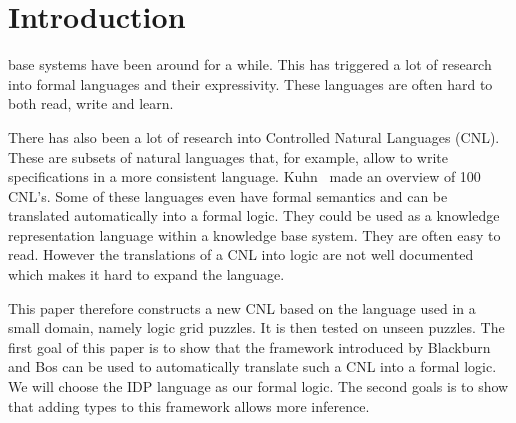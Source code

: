 \section{Introduction}

 base systems have been around for a while. This has triggered a lot of research into formal languages and their expressivity. These languages are often hard to both read, write and learn.

There has also been a lot of research into Controlled Natural Languages (CNL). These are subsets of natural languages that, for example, allow to write specifications in a more consistent language. Kuhn~\cite{Kuhn2014} made an overview of 100 CNL's. Some of these languages even have formal semantics and can be translated automatically into a formal logic. They could be used as a knowledge representation language within a knowledge base system. They are often easy to read. However the translations of a CNL into logic are not well documented which makes it hard to expand the language.

This paper therefore constructs a new CNL based on the language used in a small domain, namely logic grid puzzles. It is then tested on unseen puzzles. The first goal of this paper is to show that the framework introduced by Blackburn and Bos \cite{Blackburn2005, Blackburn2006} can be used to automatically translate such a CNL into a formal logic. We will choose the IDP \cite{IDP} language as our formal logic. The second goals is to show that adding types to this framework allows more inference.
